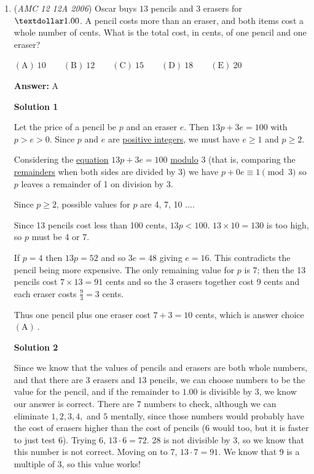 \begin{enumerate}
	\item (\textit{AMC 12 12A 2006}) Oscar buys $13$ pencils and $3$ erasers for $\textdollar 1.00$. A pencil costs more than an eraser, and both items cost a whole number of cents. What is the total cost, in cents, of one pencil and one eraser?


 $\mathrm{(A) \ } 10\qquad \mathrm{(B) \ } 12\qquad \mathrm{(C) \ } 15\qquad \mathrm{(D) \ } 18\qquad \mathrm{(E) \ }  20$

 \textbf{Answer: }A



\textbf{Solution 1}

Let the price of a pencil be $p$ and an eraser $e$.  Then $13p + 3e = 100$ with $p > e > 0$.  Since $p$ and $e$ are \href{https://artofproblemsolving.com/wiki/index.php?title=Positive\_integer}{positive integers}, we must have $e \geq 1$ and $p \geq 2$.

 Considering the \href{https://artofproblemsolving.com/wiki/index.php?title=Equation}{equation} $13p + 3e = 100$ \href{https://artofproblemsolving.com/wiki/index.php?title=Modulo}{modulo} 3 (that is, comparing the \href{https://artofproblemsolving.com/wiki/index.php?title=Remainder}{remainders} when both sides are divided by 3) we have $p + 0e \equiv 1 \pmod 3$ so $p$ leaves a remainder of 1 on division by 3.

 Since $p \geq 2$, possible values for $p$ are 4, 7, 10 ....

 Since 13 pencils cost less than 100 cents, $13p < 100$.  $13 \times 10 = 130$ is too high, so $p$ must be 4 or 7.

 If $p = 4$ then $13p = 52$ and so $3e = 48$ giving $e = 16$.  This contradicts the pencil being more expensive.  The only remaining value for $p$ is 7; then the 13 pencils cost $7 \times 13= 91$ cents and so the 3 erasers together cost 9 cents and each eraser costs $\frac{9}{3} = 3$ cents.

 Thus one pencil plus one eraser cost $7 + 3 = 10$ cents, which is answer choice $\mathrm{(A) \ }$.

 



\textbf{Solution 2}

Since we know that the values of pencils and erasers are both whole numbers, and that there are $3$ erasers and $13$ pencils, we can choose numbers to be the value for the pencil, and if the remainder to $1.00$ is divisible by 3, we know our answer is correct. There are 7 numbers to check, although we can eliminate $1, 2, 3, 4,$ and $5$ mentally, since those numbers would probably have the cost of erasers higher than the cost of pencils (6 would too, but it is faster to just test 6). Trying 6, $13 \cdot 6 = 72$. 28 is not divisible by 3, so we know that this number is not correct. Moving on to 7, $13 \cdot 7 = 91$. We know that 9 is a multiple of 3, so this value works! 


\end{enumerate}

